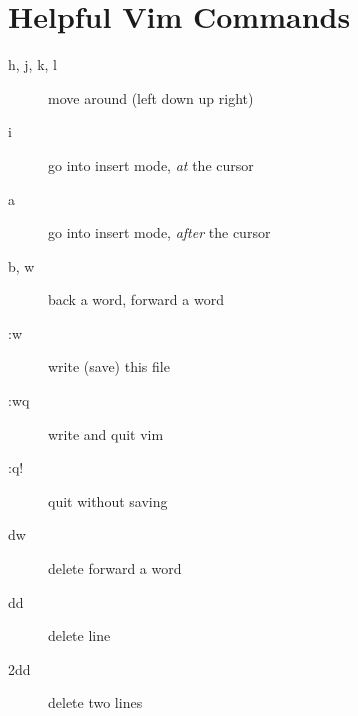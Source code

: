 \documentclass{article}
\begin{document}
\section*{Helpful Vim Commands}
\begin{multicols}{2}
    \begin{description}
        \item[h, j, k, l] move around (left down up right)
        \item[i] go into insert mode, \textit{at} the cursor
        \item[a] go into insert mode, \textit{after} the cursor
        \item[b, w] back a word, forward a word
        \item[:w] write (save) this file
        \item[:wq] write and quit vim
        \item[:q!] quit without saving
        \item[dw] delete forward a word
        \item[dd] delete line
        \item[2dd] delete two lines
    \end{description}
\end{multicols}
\end{document}
